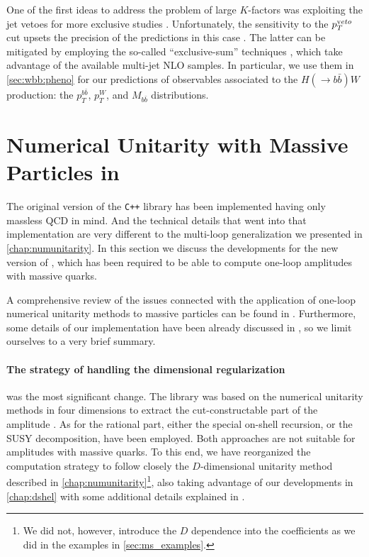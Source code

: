 One of the first ideas to address the problem of large $K$-factors was exploiting the jet vetoes 
for more exclusive studies \cite{FebresCordero:2006sj}.
Unfortunately, the sensitivity to the $p_T^{\textrm veto}$ cut upsets
the precision  of the predictions in this case \cite{Tackmann:2012bt}.
The latter can be mitigated by employing the so-called ``exclusive-sum'' techniques \cite{ESums},
which take advantage of the available multi-jet NLO samples.
In particular, we use them in \cref{sec:wbb:pheno} for our predictions of observables associated to the  $H(\rightarrow b{\bar b})W$ 
production: the $p_T^{b\bar b}$, $p_T^W$, and $M_{b\bar b}$ distributions.


\section{Numerical Unitarity with Massive Particles in \BlackHat{}}
\label{sec:BHMassiveImpl}

The original version of the \texttt{C++} library \BlackHat{} \cite{Berger:2008sj,Berger:2008ag} has been
implemented having only massless QCD in mind. 
And the technical details that went into that implementation are very different to
the multi-loop generalization we presented in \cref{chap:numunitarity}.
In this section we discuss the developments for the new version of \BlackHat{},
which has been required to be able to compute one-loop amplitudes with massive quarks.

A comprehensive review of the issues connected with the application of
one-loop numerical unitarity methods to massive particles can be found in \cite{Ellis:2011cr,Ellis:2008ir}.
Furthermore, some details of our implementation have been already discussed in \cite{FelixDiss,Anger:2018ove},
so we limit ourselves to a very brief summary.

\paragraph{The strategy of handling the dimensional regularization}
was the most significant change.
The \BlackHat{} library was based on the numerical unitarity methods in four dimensions to extract the cut-constructable part
of the amplitude \cite{Ita:2011hi,Berger:2008sj,Berger:2008ag}. As for the rational part, either the special on-shell recursion, or the SUSY decomposition, have been employed.
Both approaches are not suitable for amplitudes with massive quarks.
To this end, we have reorganized the computation strategy to follow closely the $D$-dimensional unitarity method described in \cref{chap:numunitarity}\footnote{
  We did not, however, introduce the $D$ dependence into the coefficients as we did in the examples in \cref{sec:ms_examples}.
},
also taking advantage of our developments in \cref{chap:dshel} with some additional details explained in \cite{Anger:2018ove}.

